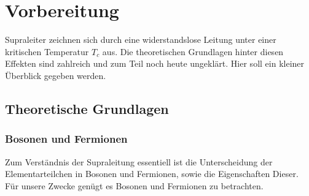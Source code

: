 \chapter{Vorbereitung}
Supraleiter zeichnen sich durch eine widerstandslose Leitung unter einer kritischen
Temperatur $T_c$ aus. Die theoretischen Grundlagen hinter 
diesen Effekten sind zahlreich und zum Teil noch heute ungeklärt. Hier soll ein
kleiner Überblick gegeben werden.

	\section{Theoretische Grundlagen}

    \subsection{Bosonen und Fermionen}
Zum Verständnis der Supraleitung essentiell ist die Unterscheidung der 
Elementarteilchen in Bosonen und Fermionen, sowie die Eigenschaften Dieser.
Für unsere Zwecke genügt es Bosonen und Fermionen zu betrachten.

